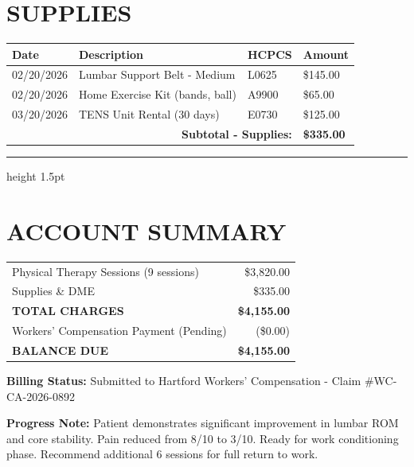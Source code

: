 \documentclass[11pt]{article}
\begin{document}
\section*{SUPPLIES}

\begin{longtable}{@{}p{2cm}p{8cm}p{2.5cm}p{2.5cm}@{}}
\toprule
\textbf{Date} & \textbf{Description} & \textbf{HCPCS} & \textbf{Amount} \\
\midrule
\endhead

02/20/2026 & Lumbar Support Belt - Medium & L0625 & \$145.00 \\
02/20/2026 & Home Exercise Kit (bands, ball) & A9900 & \$65.00 \\
03/20/2026 & TENS Unit Rental (30 days) & E0730 & \$125.00 \\
\midrule
\multicolumn{3}{r}{\textbf{Subtotal - Supplies:}} & \textbf{\$335.00} \\
\bottomrule
\end{longtable}

\vspace{1em}
\hrule height 1.5pt
\vspace{0.5em}

\section*{ACCOUNT SUMMARY}

\begin{tabular}{@{}p{10cm}r@{}}
Physical Therapy Sessions (9 sessions) & \$3,820.00 \\
Supplies \& DME & \$335.00 \\
\midrule
\textbf{TOTAL CHARGES} & \textbf{\$4,155.00} \\
\midrule
Workers' Compensation Payment (Pending) & (\$0.00) \\
\textbf{BALANCE DUE} & \textbf{\$4,155.00} \\
\end{tabular}

\vspace{1.5em}

\textbf{Billing Status:} Submitted to Hartford Workers' Compensation - Claim \#WC-CA-2026-0892

\vspace{0.5em}
\textbf{Progress Note:} Patient demonstrates significant improvement in lumbar ROM and core stability. Pain reduced from 8/10 to 3/10. Ready for work conditioning phase. Recommend additional 6 sessions for full return to work.
\end{document}
